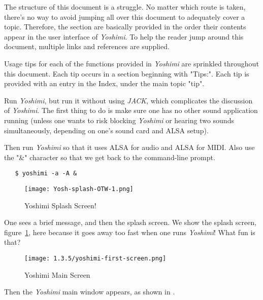 \documentclass[
 11pt,
 twoside,
 a4paper,
 headinclude,
 footinclude,
 final                                 %
]{article}
\begin{document}
   The structure of this document is a struggle.  No matter which route is
   taken, there's no way to avoid jumping all over this document to
   adequately cover a topic.  Therefore, the section are basically provided
   in the order their contents appear in the user interface of
   \textsl{Yoshimi}.  To help the reader jump around this document, multiple
   links and references are supplied.

   Usage tips
   for each of the functions provided in
   \textsl{Yoshimi} are sprinkled throughout this document.
   Each tip occurs in a section beginning with "Tips:".
   Each tip is provided with an entry in the Index, under the
   main topic "tip".

   Run \textsl{Yoshimi}, but run it without using \textsl{JACK}, which
   complicates the discussion of \textsl{Yoshimi}.  The first
   thing to do is make sure one has no other sound application running
   (unless one wants to risk blocking \textsl{Yoshimi} or hearing two sounds
   simultaneously, depending on one's sound card and ALSA setup).

   Then run \textsl{Yoshimi} so that it uses ALSA for audio and ALSA for
   MIDI.  Also use the "\&" character so that we get back to the
   command-line prompt.

\begin{verbatim}
   $ yoshimi -a -A &
\end{verbatim}

\begin{figure}[H]
   \centering 
   \texttt{[image: Yosh-splash-OTW-1.png]}
   \caption{Yoshimi Splash Screen!}
   \label{fig:yoshimi_splash_screen}
\end{figure}

   One sees a brief message, and then the splash screen.
   We show the splash screen, figure~\ref{fig:yoshimi_splash_screen},
   here because it goes away too
   fast when one runs \textsl{Yoshimi}!
   What fun is that?

\begin{figure}[H]
   \centering 
   \texttt{[image: 1.3.5/yoshimi-first-screen.png]}
   \caption{Yoshimi Main Screen}
   \label{fig:yoshimi_main_screen}
\end{figure}

   
   Then the \textsl{Yoshimi} main window appears, as shown in
   .
\end{document}
